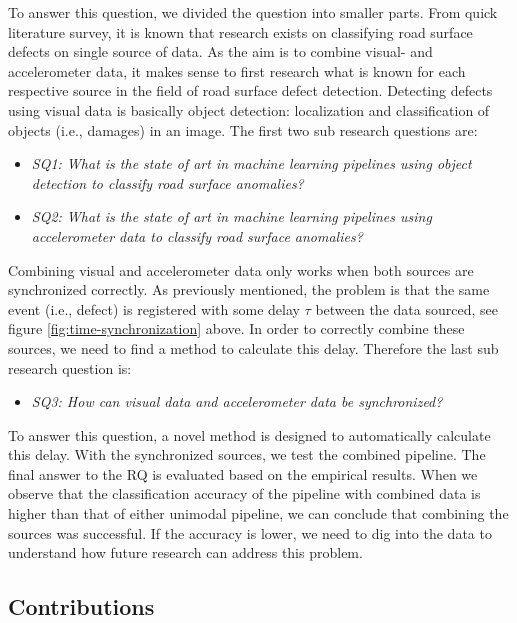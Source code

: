 To answer this question, we divided the question into smaller parts. From quick literature survey, it is known that research exists on classifying road surface defects on single source of data. As the aim is to combine visual- and accelerometer data, it makes sense to first research what is known for each respective source in the field of road surface defect detection. Detecting defects using visual data is basically object detection: localization and classification of objects (i.e., damages) in an image. The first two sub research questions are:

\begin{itemize}
\item \textit{SQ1: What is the state of art in machine learning pipelines using object detection to classify road surface anomalies?}
\item \textit{SQ2: What is the state of art in machine learning pipelines using accelerometer data to classify road surface anomalies?}
\end{itemize}

Combining visual and accelerometer data only works when both sources are synchronized correctly. As previously mentioned, the problem is that the same event (i.e., defect) is registered with some delay $\tau$ between the data sourced, see figure \ref{fig:time-synchronization} above. In order to correctly combine these sources, we need to find a method to calculate this delay. Therefore the last sub research question is:

\begin{itemize}
\item \textit{SQ3: How can visual data and accelerometer data be synchronized?}
\end{itemize}

To answer this question, a novel method is designed to automatically calculate this delay. With the synchronized sources, we test the combined pipeline. The final answer to the RQ is evaluated based on the empirical results. When we observe that the classification accuracy of the pipeline with combined data is higher than that of either unimodal pipeline, we can conclude that combining the sources was successful. If the accuracy is lower, we need to dig into the data to understand how future research can address this problem.


\subsection{Contributions}

